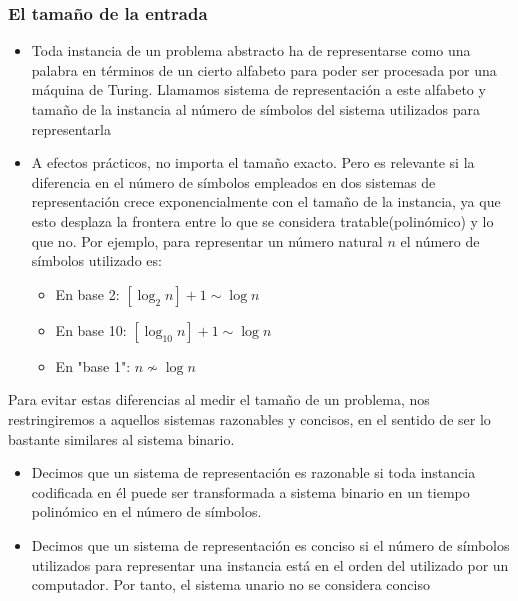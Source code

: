 \documentclass{beamer}
\begin{document}
 \begin{frame}
 	\frametitle{El tamaño de la entrada}
 	\begin{itemize}
 		\item Toda instancia de un problema abstracto ha de representarse como una palabra en términos de un cierto alfabeto para poder ser procesada por una máquina de Turing. Llamamos \alert{sistema de representación} a este alfabeto y \alert{tamaño de la instancia} al número de símbolos del sistema utilizados para representarla

 		\item A efectos prácticos, no importa el tamaño exacto. Pero es relevante si la diferencia en el número de símbolos empleados en dos sistemas de representación crece exponencialmente con el tamaño de la instancia, ya que esto desplaza la frontera entre lo que se considera tratable(polinómico) y lo que no. Por ejemplo, para representar un número natural $n$ el número de símbolos utilizado es:
 		\begin{itemize}
 			\item En base 2: $[\log_2 n] + 1 \sim \log n$
 			\item En base 10: $[\log_{10} n] + 1 \sim \log n$
 			 \item En "base 1": $n \nsim \log n$
 		\end{itemize}
 	\end{itemize}
 \end{frame}

\begin{frame}
	Para evitar estas diferencias al medir el tamaño de un problema, nos restringiremos a aquellos sistemas razonables y concisos, en el sentido de ser lo bastante similares al sistema binario.
	\begin{itemize}
		\item Decimos que un sistema de representación es \alert{razonable} si toda instancia codificada en él puede ser transformada a sistema binario en un tiempo polinómico en el número de símbolos. 
		\item Decimos que un sistema de representación es \alert{conciso} si el número de símbolos utilizados para representar una instancia está en el orden del utilizado por un computador. Por tanto, el sistema unario no se considera conciso
	\end{itemize}
\end{frame}
\end{document}
